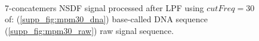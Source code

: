 \begin{figure}[!hpt]
\centering
{}
\\
\caption[NSDF signal processed after smoothing with LPF at $cutFreq=30$]{7-concatemers NSDF signal processed after LPF using $cutFreq=30$ of: (\ref{supp_fig:mpm30_dna}) base-called DNA sequence (\ref{supp_fig:mpm30_raw}) raw signal sequence.}
\label{supp_fig:mpm30}
\end{figure}
